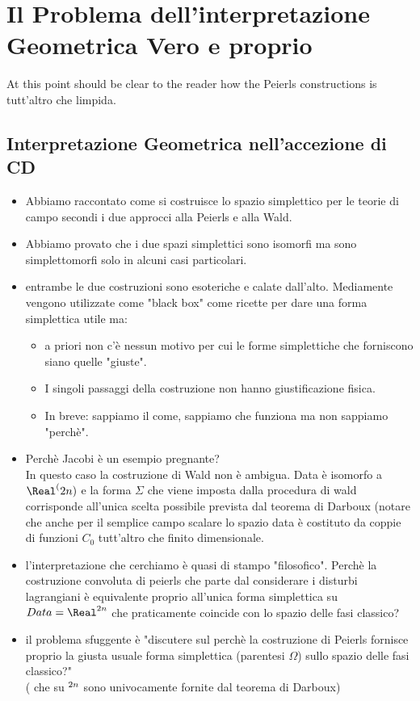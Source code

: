 \documentclass[Main]{subfiles}
\begin{document}
	\section{Il Problema dell'interpretazione Geometrica Vero e proprio}
		At this point should be clear to the reader how the Peierls constructions is tutt'altro che limpida.
		


		\subsection{Interpretazione Geometrica nell'accezione di CD}
			\begin{itemize}
				\item Abbiamo raccontato come si costruisce lo spazio simplettico per le teorie di campo secondi i due approcci alla Peierls e alla Wald.
				\item  Abbiamo provato che i due spazi simplettici sono isomorfi ma sono simplettomorfi solo in alcuni casi particolari.
				\item entrambe le due costruzioni sono esoteriche e calate dall'alto. 
					Mediamente vengono utilizzate come "black box" come ricette per dare una forma simplettica utile ma:
				\begin{itemize}
					\item a priori non c'è nessun motivo per cui le forme simplettiche che forniscono siano quelle "giuste".
					\item I singoli passaggi della costruzione non hanno giustificazione fisica.
					\item 	In breve: sappiamo il come, sappiamo che funziona ma non sappiamo "perchè".
				\end{itemize}
				\item Perchè Jacobi è un esempio pregnante?\\
					In questo caso la costruzione di Wald non è ambigua. Data è isomorfo a $\Real^(2n)$ e la forma $\Sigma$ che viene imposta dalla procedura di wald corrisponde all'unica scelta possibile prevista dal teorema di Darboux (notare che anche per il semplice campo scalare lo spazio data è costituto da coppie di funzioni $C_0$ tutt'altro che finito dimensionale.
				\item l'interpretazione che cerchiamo è quasi di stampo "filosofico". Perchè la costruzione convoluta di peierls che parte dal considerare i disturbi lagrangiani è equivalente proprio all'unica forma simplettica su $Data=\Real^{2n}$ che praticamente coincide con lo spazio delle fasi classico?
				\item il problema sfuggente è "discutere sul perchè la costruzione di Peierls fornisce proprio la giusta usuale forma simplettica (parentesi $\Omega$) sullo spazio delle fasi classico?"\\
					( che su $\real^{2n} $ sono univocamente fornite dal teorema di Darboux)			
		\end{itemize}
\end{document}

